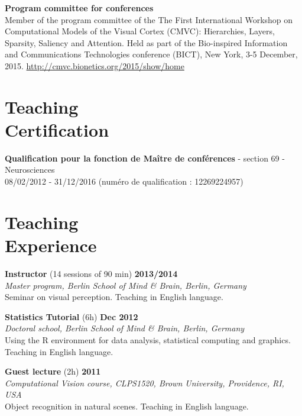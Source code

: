 \documentclass[margin,line]{resume}
\begin{document}
\begin{resume}
\textbf{Program committee for conferences} \\
Member of the program committee of the The First International Workshop on Computational Models of the Visual Cortex (CMVC): Hierarchies, Layers, Sparsity, Saliency and Attention. Held as part of the Bio-inspired Information and Communications Technologies conference (BICT), New York, 3-5 December, 2015.
 \url{http://cmvc.bionetics.org/2015/show/home}
 
	\vspace{3mm}
	\section{\mysidestyle Teaching\\Certification}
    \textbf{Qualification pour la fonction de Maître de conférences} - section 69 - Neurosciences\\
    08/02/2012 - 31/12/2016 (numéro de qualification : 12269224957)


\newpage

	\vspace{3mm}
    \section{\mysidestyle Teaching\\Experience}
    
   	 \textbf{Instructor} (14 sessions of 90 min) \hfill \textbf{2013/2014}\\
	\textsl{Master program, Berlin School of Mind \& Brain, Berlin, Germany}\\
	Seminar on visual perception. Teaching in English language.
	
    	\textbf{Statistics Tutorial} (6h) \hfill \textbf{Dec 2012}\\
	\textsl{Doctoral school, Berlin School of Mind \& Brain, Berlin, Germany}\\
	Using the R environment for data analysis, statistical computing and graphics. Teaching in English language.

	\textbf{Guest lecture} (2h) \hfill \textbf{2011}\\
	\textsl{Computational Vision course, CLPS1520, Brown University, Providence, RI, USA}\\
	Object recognition in natural scenes. Teaching in English language.


\end{resume}
\end{document}
